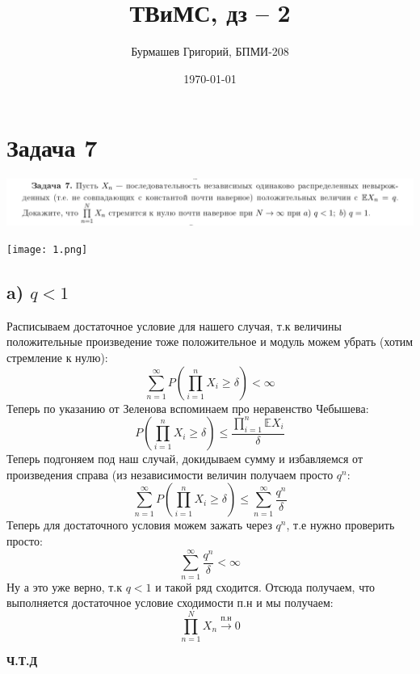 \documentclass[a4paper,12pt]{article}
\author{Бурмашев Григорий, БПМИ-208}
\title{ТВиМС, дз -- 2}
\date{\today}
\begin{document}
\maketitle
\section*{Задача 7}
\begin{center}
\includegraphics[scale=0.3]{2.png}
\end{center}
\begin{center}
\texttt{[image: 1.png]}
\end{center}
\subsection*{a) $q < 1$}
Расписываем достаточное условие для нашего случая, т.к величины положительные произведение тоже положительное и модуль можем убрать (хотим стремление к нулю):
\[
\sum_{n=1}^{\infty} P 
\left(
\prod_{i = 1}^{n} X_i 
\geq \delta 
\right) 
< \infty 
\]
Теперь по указанию от Зеленова вспоминаем про неравенство Чебышева:
\[
P
\left(
\prod_{i= 1}^{n} X_i
\geq \delta
\right) 
\leq
\frac{\prod\limits_{i = 1}^{n} \mathbb{E} X_i }{\delta}
\]
Теперь подгоняем под наш случай, докидываем сумму и избавляемся от произведения справа (из независимости величин получаем просто $q^n$:
\[
\sum_{n=1}^{\infty} P 
\left(
\prod_{i = 1}^{n} X_i
\geq \delta
\right) 
\leq
\sum_{n=1}^{\infty}
\frac{q^n}{\delta}
\]
Теперь для достаточного условия можем зажать через $q^n$, т.е нужно проверить просто:
\[
\sum_{n=1}^{\infty}
\frac{q^n}{\delta} 
< \infty 
\]
Ну а это уже верно, т.к $q < 1$ и такой ряд сходится. Отсюда получаем, что выполняется достаточное условие сходимости п.н  и мы получаем:
\[
\prod_{n = 1}^{N} X_n   \overset{\text{п.н}}{\longrightarrow} 0
\]
\begin{center}
\textbf{Ч.Т.Д} 
\end{center}
\end{document}
